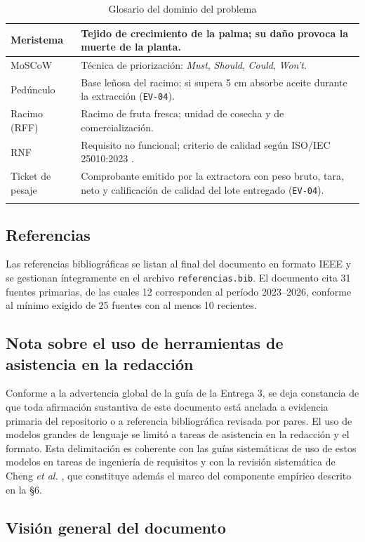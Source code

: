 \documentclass[11pt,a4paper]{article}
\newcommand{\id}[1]{\texttt{\begingroup\hyphenpenalty=10000\relax#1\endgroup}}
\renewcommand{\id}[1]{\texttt{#1}}
\begin{document}
\begin{longtable}{|L{3.6cm}|L{11.8cm}|}
Meristema & Tejido de crecimiento de la palma; su daño provoca la muerte de la planta. \\ \hline
MoSCoW & Técnica de priorización: \emph{Must}, \emph{Should}, \emph{Could}, \emph{Won't}. \\ \hline
Pedúnculo & Base leñosa del racimo; si supera 5 cm absorbe aceite durante la extracción (\id{EV-04}). \\ \hline
Racimo (RFF) & Racimo de fruta fresca; unidad de cosecha y de comercialización. \\ \hline
RNF & Requisito no funcional; criterio de calidad según ISO/IEC 25010:2023 \cite{iso25010}. \\ \hline
Ticket de pesaje & Comprobante emitido por la extractora con peso bruto, tara, neto y calificación de calidad del lote entregado (\id{EV-04}). \\ \hline
\caption{Glosario del dominio del problema}
\end{longtable}

\subsection{Referencias}

Las referencias bibliográficas se listan al final del documento en formato IEEE y se gestionan
íntegramente en el archivo \id{referencias.bib}. El documento cita 31 fuentes primarias, de las
cuales 12 corresponden al período 2023--2026, conforme al mínimo exigido de 25 fuentes con al
menos 10 recientes.

\subsection{Nota sobre el uso de herramientas de asistencia en la redacción}

Conforme a la advertencia global de la guía de la Entrega 3, se deja constancia de que toda
afirmación sustantiva de este documento está anclada a evidencia primaria del repositorio o a
referencia bibliográfica revisada por pares. El uso de modelos grandes de lenguaje se limitó a
tareas de asistencia en la redacción y el formato. Esta delimitación es coherente con las guías
sistemáticas de uso de estos modelos en tareas de ingeniería de requisitos
\cite{vogelsang2024,arora2024} y con la revisión sistemática de Cheng \emph{et al.}
\cite{cheng2026}, que constituye además el marco del componente empírico descrito en la §6.

\subsection{Visión general del documento}
\end{document}
